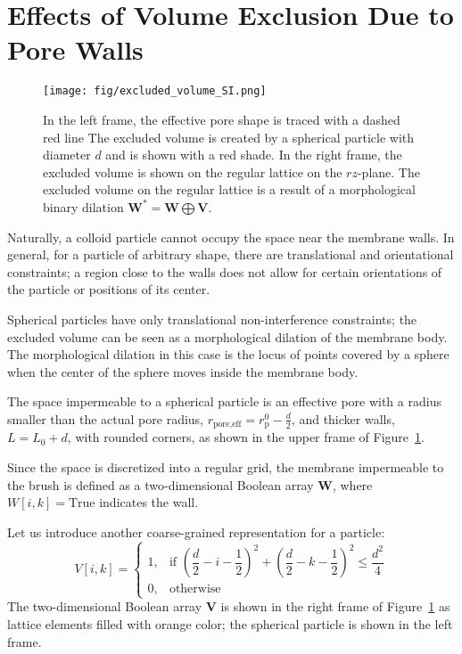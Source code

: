 \documentclass[10pt, a4paper]{article}
\begin{document}
\pagebreak
\section{Effects of Volume Exclusion Due to Pore Walls}

\begin{multicols}{2}

\begin{figure}[H]
    \centering
    \texttt{[image: fig/excluded\_volume\_SI.png]}
    \caption{
        In the left frame, the effective pore shape is traced with a dashed red line
        The excluded volume is created by a spherical particle with diameter $d$ and is shown with a red shade.
        In the right frame, the excluded volume is shown on the regular lattice on the $rz$-plane.
        The excluded volume on the regular lattice is a result of a morphological binary dilation $\bm{W}^{\ast} = \bm{W} \bigoplus \bm{V}$.
        }
    \label{fig:excluded_volume}
\end{figure}

Naturally, a colloid particle cannot occupy the space near the membrane walls.
In general, for a particle of arbitrary shape, there are translational and orientational constraints; a region close to the walls does not allow for certain orientations of the particle or positions of its center.

Spherical particles have only translational non-interference constraints; the excluded volume can be seen as a morphological dilation of the membrane body.
The morphological dilation in this case is the locus of points covered by a sphere when the center of the sphere moves inside the membrane body.

The space impermeable to a spherical particle is an effective pore with a radius smaller than the actual pore radius, $r_{\text{pore,eff}} = r_{\text{p}}^{0} - \frac{d}{2}$, and thicker walls, $L = L_{0} + d$, with rounded corners, as shown in the upper frame of Figure~\ref{fig:excluded_volume}.

Since the space is discretized into a regular grid, the membrane impermeable to the brush is defined as a two-dimensional Boolean array $\bm{W}$, where $W[i, k] = \text{True}$ indicates the wall.

Let us introduce another coarse-grained representation for a particle:
\begin{equation}
    V[i, k] = 
    \begin{cases}
            1, & \text{if } \left( \dfrac{d}{2} - i - \dfrac{1}{2} \right)^2 + \left( \dfrac{d}{2} - k - \dfrac{1}{2} \right)^2 \le \dfrac{d^2}{4} \\
            0, & \text{otherwise}
        \end{cases}
\end{equation}
The two-dimensional Boolean array $\bm{V}$ is shown in the right frame of Figure~\ref{fig:excluded_volume} as lattice elements filled with orange color; the spherical particle is shown in the left frame.


\end{multicols}
\end{document}
